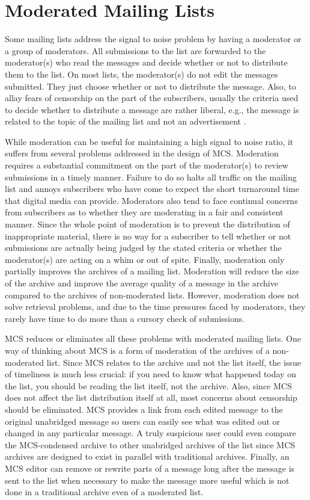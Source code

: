 \section{Moderated Mailing Lists}
Some mailing lists address the signal to noise problem by having a moderator or
a group of moderators. All submissions to the list are forwarded to the
moderator(s) who read the messages and decide whether or not to distribute them
to the list. On most lists, the moderator(s) do not edit the messages
submitted. They just choose whether or not to distribute the message. Also, to
allay fears of censorship on the part of the subscribers, usually the criteria
used to decide whether to distribute a message are rather liberal, e.g., the
message is related to the topic of the mailing list and not an advertisement
\cite{pedersen2-96}.

While moderation can be useful for maintaining a high signal to noise ratio, it
suffers from several problems addressed in the design of MCS. Moderation
requires a substantial commitment on the part of the moderator(s) to review
submissions in a timely manner. Failure to do so halts all traffic on the
mailing list and annoys subscribers who have come to expect the short
turnaround time that digital media can provide. Moderators also tend to face
continual concerns from subscribers as to whether they are moderating in a fair
and consistent manner.  Since the whole point of moderation is to prevent the
distribution of inappropriate material, there is no way for a subscriber to
tell whether or not submissions are actually being judged by the stated
criteria or whether the moderator(s) are acting on a whim or out of spite.
Finally, moderation only partially improves the archives of a mailing list.
Moderation will reduce the size of the archive and improve the average quality
of a message in the archive compared to the archives of non-moderated lists.
However, moderation does not solve retrieval problems, and due to the time
pressures faced by moderators, they rarely have time to do more than a cursory
check of submissions.

MCS reduces or eliminates all these problems with moderated mailing lists. One
way of thinking about MCS is a form of moderation of the archives of a
non-moderated list. Since MCS relates to the archive and not the list itself,
the issue of timeliness is much less crucial: if you need to know what happened
today on the list, you should be reading the list itself, not the archive.
Also, since MCS does not affect the list distribution itself at all, most
concerns about censorship should be eliminated. MCS provides a link from each
edited message to the original unabridged message so users can easily see what
was edited out or changed in any particular message. A truly suspicious user
could even compare the MCS-condensed archive to other unabridged archives of
the list since MCS archives are designed to exist in parallel with traditional
archives.  Finally, an MCS editor can remove or rewrite parts of a message long
after the message is sent to the list when necessary to make the message more
useful which is not done in a traditional archive even of a moderated list.

